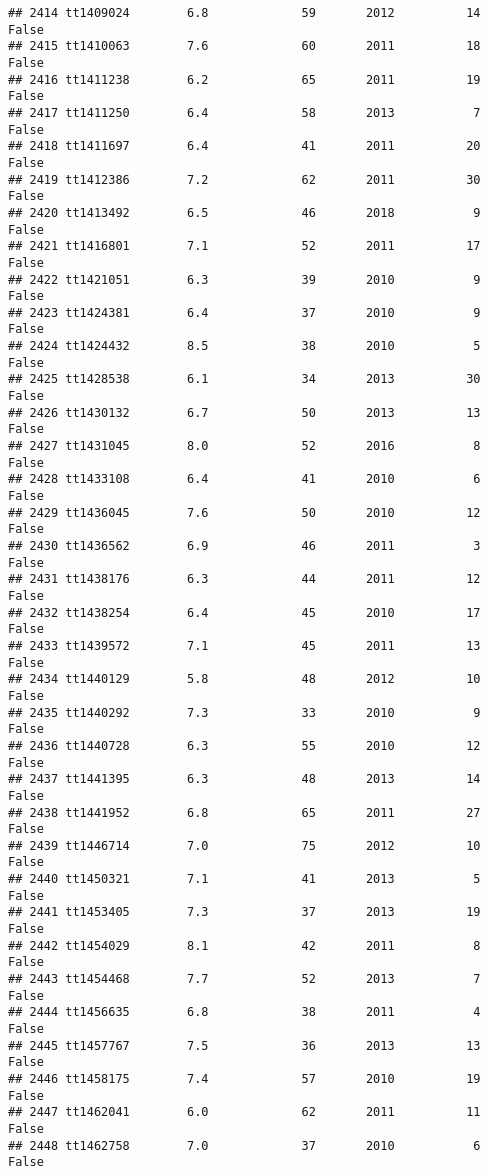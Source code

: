 \documentclass[
]{article}
\begin{document}
\begin{verbatim}
## 2414 tt1409024        6.8             59       2012          14   False
## 2415 tt1410063        7.6             60       2011          18   False
## 2416 tt1411238        6.2             65       2011          19   False
## 2417 tt1411250        6.4             58       2013           7   False
## 2418 tt1411697        6.4             41       2011          20   False
## 2419 tt1412386        7.2             62       2011          30   False
## 2420 tt1413492        6.5             46       2018           9   False
## 2421 tt1416801        7.1             52       2011          17   False
## 2422 tt1421051        6.3             39       2010           9   False
## 2423 tt1424381        6.4             37       2010           9   False
## 2424 tt1424432        8.5             38       2010           5   False
## 2425 tt1428538        6.1             34       2013          30   False
## 2426 tt1430132        6.7             50       2013          13   False
## 2427 tt1431045        8.0             52       2016           8   False
## 2428 tt1433108        6.4             41       2010           6   False
## 2429 tt1436045        7.6             50       2010          12   False
## 2430 tt1436562        6.9             46       2011           3   False
## 2431 tt1438176        6.3             44       2011          12   False
## 2432 tt1438254        6.4             45       2010          17   False
## 2433 tt1439572        7.1             45       2011          13   False
## 2434 tt1440129        5.8             48       2012          10   False
## 2435 tt1440292        7.3             33       2010           9   False
## 2436 tt1440728        6.3             55       2010          12   False
## 2437 tt1441395        6.3             48       2013          14   False
## 2438 tt1441952        6.8             65       2011          27   False
## 2439 tt1446714        7.0             75       2012          10   False
## 2440 tt1450321        7.1             41       2013           5   False
## 2441 tt1453405        7.3             37       2013          19   False
## 2442 tt1454029        8.1             42       2011           8   False
## 2443 tt1454468        7.7             52       2013           7   False
## 2444 tt1456635        6.8             38       2011           4   False
## 2445 tt1457767        7.5             36       2013          13   False
## 2446 tt1458175        7.4             57       2010          19   False
## 2447 tt1462041        6.0             62       2011          11   False
## 2448 tt1462758        7.0             37       2010           6   False

\end{verbatim}
\end{document}
